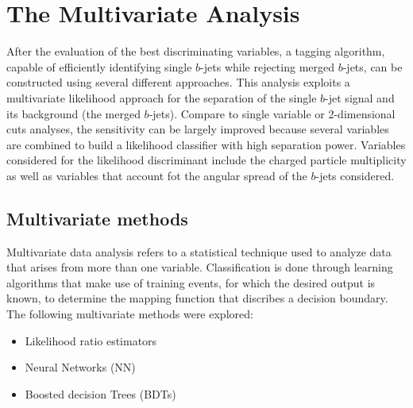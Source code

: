 %
\chapter{The Multivariate Analysis}\label{ch:mva}
%

After the evaluation of the best discriminating variables, %
a tagging algorithm, capable of efficiently identifying single $b$-jets while rejecting merged $b$-jets, can be constructed using several different approaches.  
This analysis exploits a multivariate likelihood approach for the separation of the single $b$-jet signal and its background (the merged $b$-jets). Compare to single variable or 2-dimensional cuts analyses, the sensitivity can be largely improved because several variables are combined to build a likelihood classifier with high separation power.   Variables considered for the likelihood discriminant include the charged particle multiplicity as well as variables that account fot the angular spread of the $b$-jets considered. 

\section{Multivariate methods}\label{sec:mvamethods}

Multivariate data analysis refers to a statistical technique used to analyze data that arises from more than one variable.  Classification is done through learning algorithms that make use of training events,  for which the desired output is known, to determine the mapping function that discribes a decision boundary. The following multivariate methods were explored: %

\begin{itemize}\addtolength{\itemsep}{-0.4\baselineskip}
\item
Likelihood ratio estimators 
\item
Neural Networks (NN)
\item
Boosted decision Trees (BDTs)
\end{itemize}

